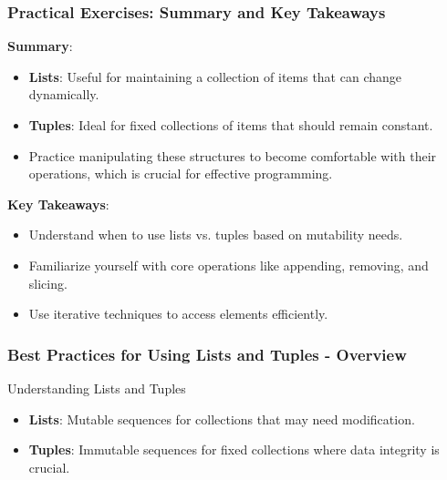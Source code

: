 \documentclass{beamer}
\begin{document}
\begin{frame}[fragile]
    \frametitle{Practical Exercises: Summary and Key Takeaways}
    \textbf{Summary}:
    \begin{itemize}
        \item \textbf{Lists}: Useful for maintaining a collection of items that can change dynamically.
        \item \textbf{Tuples}: Ideal for fixed collections of items that should remain constant.
        \item Practice manipulating these structures to become comfortable with their operations, which is crucial for effective programming.
    \end{itemize}
    
    \textbf{Key Takeaways}:
    \begin{itemize}
        \item Understand when to use lists vs. tuples based on mutability needs.
        \item Familiarize yourself with core operations like appending, removing, and slicing.
        \item Use iterative techniques to access elements efficiently.
    \end{itemize}
\end{frame}

\begin{frame}[fragile]
    \frametitle{Best Practices for Using Lists and Tuples - Overview}
    \begin{block}{Understanding Lists and Tuples}
        \begin{itemize}
            \item \textbf{Lists}: Mutable sequences for collections that may need modification.
            \item \textbf{Tuples}: Immutable sequences for fixed collections where data integrity is crucial.
        \end{itemize}
    \end{block}
\end{frame}
\end{document}
